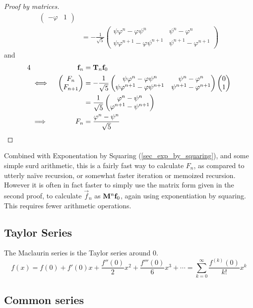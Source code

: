 \begin{proof}[Proof by matrices]
\begin{align*}
\begin{pmatrix}
            -\varphi & 1
        \end{pmatrix} \\
        &=
        -\frac 1 {\sqrt 5}
        \begin{pmatrix}
            \psi \varphi^n -\varphi \psi^n & \psi^n - \varphi^n \\
            \psi \varphi^{n + 1} - \varphi \psi^{n + 1} &
                \psi^{n + 1} - \varphi^{n + 1}
        \end{pmatrix}
    \end{align*}
    and
    \begin{alignat*}4
        &&\vec f_n &= \mat T_n \vec f_0 \\
        &\iff{}&
        \begin{pmatrix}
            F_n \\
            F_{n + 1}
        \end{pmatrix} &=
        -\frac 1 {\sqrt 5}
        \begin{pmatrix}
            \psi \varphi^n -\varphi \psi^n & \psi^n - \varphi^n \\
            \psi \varphi^{n + 1} - \varphi \psi^{n + 1} &
                \psi^{n + 1} - \varphi^{n + 1}
        \end{pmatrix}
        \begin{pmatrix}
            0 \\
            1
        \end{pmatrix} \\
        && &=
        \frac 1 {\sqrt 5}
        \begin{pmatrix}
            \varphi^n - \psi^n \\
            \varphi^{n + 1} - \psi^{n + 1}
        \end{pmatrix} \\
        &\implies{}& F_n &= \frac{\varphi^n - \psi^n}{\sqrt 5} \qedhere
    \end{alignat*}
\end{proof}
Combined with Exponentation by Squaring (\ref{sec_exp_by_squaring}), and some
simple surd arithmetic, this is a fairly fast way to calculate \(F_n\), as
compared to utterly na\"ive recursion, or somewhat faster iteration or memoized
recursion. However it is often in fact faster to simply use the matrix form
given in the second proof, to calculate \(\vec f_n\) as \(\mathbf{M}^n\mathrm{\mathbf{f}}_0\),
again using exponentiation by squaring. This requires fewer arithmetic
operations.

\subsection{Taylor Series}

The Maclaurin series is the Taylor series around \(0\).
\begin{equation}
f(x) = f(0) + f'(0) x + \frac{f''(0)} 2 x^2 + \frac{f'''(0)}6 x^3 +\dotsb
  = \sum_{k=0}^\infty \frac{f^{(k)}(0)}{k!}x^k
\end{equation}

\subsection{Common series}
